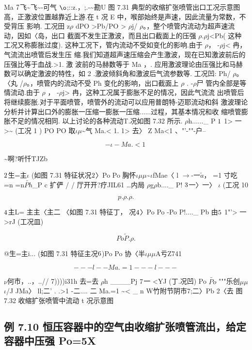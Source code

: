 Ma ${\rm 7}$飞\textasciitilde{}飞\textasciitilde{}-可气 ${\rm ø}$;::z.，;.-\textasciitilde{}勘U 图 7.31 典型的收缩扩张喷管出口工况示意图 高，正激波位置越靠近上游.在 t 况 E 中，喉部始终是声速，因此流量为常数，不受背压 影响. 工况田 z$\rho$ dPO >Pb/PO > $\rho$j/ $\rho$。，整个喷管内流动为超声速流动，因如〈岛，出口 截面不发生正激波，而且出口截面上的压强 $\rho$.$\rho$j<Pb( 这种工况又称膨胀过度). 这种工况下，管内流动不受如变化的影响.由于 $\rho$， -$\rho$j< 冉，气流流出喷管后发生压 缩.我们知道超声速压缩会产生激波，现在已知激波前后的压强比等于血战.>1. 激 波前的马赫数等于 Ma ，. 应用激波理论由压强比和马赫数可以确定激波的特性，如 2 .激波倾斜角和激波后气流参数等. 工况凹: Ph/ $\rho$。 〈丸 /$\rho$。，喷管内的流动不受 Ph 变化的影响，出口截面上 $\rho$ . -$\rho$尸 管内全部是等情流动.由于 $\rho$ ， -$\rho$j> 冉，这种工况属于膨胀不足的情况，因此气流流 出喷管后将继续膨胀.对于平面喷管，喷管外的流动可以应用普朗特-迈耶流动和斜 激波理论分析并计算出口外的膨胀一压缩一膨胀一压缩......过程，其基本情况和收 缩喷管膨胀不足的情况相同. 以上讨论的各种流动T.况如图 7.32 所示. $\rho$h......\_ P ${\rm 1}$ 1> 一>\textasciitilde{} (工况 1 ) PO PO 取$\iota$$\mu$\textasciitilde{}气 Ma.< 1. 1> 去〉 Z Ma<1 、"'-""-户--

\[-\iota - Ma.<1 ~\]

\textasciitilde{}啊?听忏TJZb

${\rm 2}$生=主$\iota$ (如图 7.31 特征状况${\rm 2}$〉Po Po 胸怀$\iota$$\mu$$\mu$\textasciitilde{}$\iota$fMae〈 l $\rightarrow$-一$\tilde{a}$， =1 寸吃 =n =n$\tilde{Ph}$\_P c 扩俨 / / 厅开开?疗JIL61 …内局 $\rho$g$\rho$b....\_ P! ${\rm 3}$一〉一〉 $\iota$ (工况 10

\[p .  \rho  .  \rho  . \]

${\rm 4}$主L= 主主〈主二 〈如图 7.31 特征丁， 况${\rm 4}$〉Po Po -Po P!....\_ Pb 由${\rm 5}$ 1"'> 一 >rJ (工况皿)

\[Po \tilde{P} .  \rho  . \]

@生=主i... (如图 7.31 特征主况${\rm 6}$)Po Po 协〈半$\iota$$\mu$$\mu$A亏Z741

\[---l-- Ma. = 1 ---l-- -\]

$\nu$何市，..，..// 7))))i31h 去=去 $\rho$h \_\_\_\_Pj ${\rm 7}$一 <YJ (丁.况凹) Po $\tilde{Po}$ """乐创$\mu$$\mu$$\iota$/J JMa〉 ll;二' . .>1 -二.... 二 Ma.=1 \textasciitilde{}< \_ n W竹附节阴市7;二〉Pb 2〈去 图7.32 收缩扩张喷管中流动 t 况示意图

\subsection*{例 7.10  恒压容器中的空气由收缩扩张喷管流出，给定容器中压强 Po=5X}

